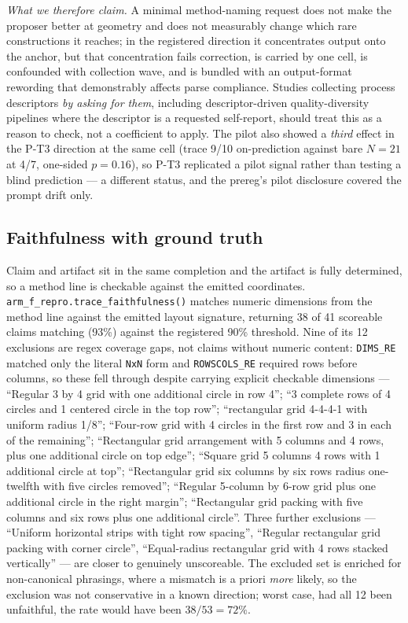 \emph{What we therefore claim.} A minimal method-naming request does not make the proposer better at
geometry and does not measurably change which rare constructions it reaches; in the registered
direction it concentrates output onto the anchor, but that concentration fails correction, is
carried by one cell, is confounded with collection wave, and is bundled with an output-format
rewording that demonstrably affects parse compliance. Studies collecting process descriptors \emph{by
asking for them}, including descriptor-driven quality-diversity pipelines where the descriptor is
a requested self-report, should treat this as a reason to check, not a coefficient to apply. The
pilot also showed a \emph{third} effect in the P-T3 direction at the same cell (trace 9/10
on-prediction against bare $N = 21$ at 4/7, one-sided $p = 0.16$), so P-T3 replicated a pilot signal
rather than testing a blind prediction --- a different status, and the prereg's pilot disclosure
covered the prompt drift only.

\subsection{Faithfulness with ground truth}

Claim and artifact sit in the same completion and the artifact is fully determined, so a method
line is checkable against the emitted coordinates. \texttt{arm\_f\_repro.trace\_faithfulness()} matches
numeric dimensions from the method line against the emitted layout signature, returning 38 of 41
scoreable claims matching (93\%) against the registered 90\% threshold. Nine of its 12 exclusions are regex
coverage gaps, not claims without numeric content: \texttt{DIMS\_RE} matched only the
literal \texttt{NxN} form and \texttt{ROWSCOLS\_RE} required rows before columns, so these fell through despite
carrying explicit checkable dimensions --- ``Regular 3 by 4 grid with one additional circle in row
4''; ``3 complete rows of 4 circles and 1 centered circle in the top row''; ``rectangular grid 4-4-4-1
with uniform radius 1/8''; ``Four-row grid with 4 circles in the first row and 3 in each of the
remaining''; ``Rectangular grid arrangement with 5 columns and 4 rows, plus one additional circle on
top edge''; ``Square grid 5 columns 4 rows with 1 additional circle at top''; ``Rectangular grid six
columns by six rows radius one-twelfth with five circles removed''; ``Regular 5-column by 6-row grid
plus one additional circle in the right margin''; ``Rectangular grid packing with five columns and
six rows plus one additional circle''. Three further exclusions --- ``Uniform horizontal strips with
tight row spacing'', ``Regular rectangular grid packing with corner circle'', ``Equal-radius
rectangular grid with 4 rows stacked vertically'' --- are closer to genuinely unscoreable. The
excluded set is enriched for non-canonical phrasings, where a mismatch is a priori \emph{more} likely,
so the exclusion was not conservative in a known direction; worst case, had all 12 been
unfaithful, the rate would have been $38/53 = 72\%$.

